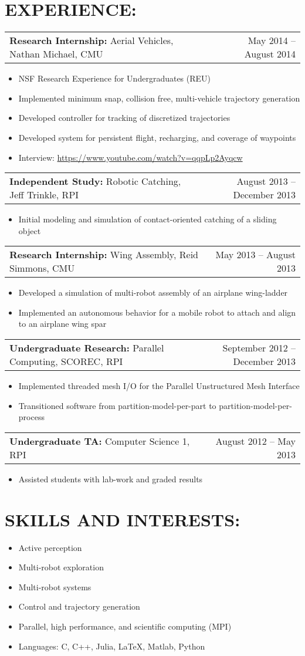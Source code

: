 \documentclass[margin]{res}
\newcommand{\experience}[4]{
	\begin{tabular}{p{4in} r}
    {\bf #1} #2 & #3
  \end{tabular}
  \begin{itemize}
      #4
  \end{itemize}
}
\begin{document}
\begin{resume}
 \section{EXPERIENCE:}
  \experience{Research Internship:}{Aerial Vehicles, Nathan Michael, CMU}
    {May 2014 -- August 2014}
  {
    \item NSF Research Experience for Undergraduates (REU)
    \item Implemented minimum snap, collision free, multi-vehicle trajectory
      generation
    \item Developed controller for tracking of discretized trajectories
    \item Developed system for persistent flight, recharging, and coverage of waypoints
    \item Interview: \url{https://www.youtube.com/watch?v=qqpLp2Ayqcw}
  }
  \experience{Independent Study:}{Robotic Catching, Jeff Trinkle, RPI}{ August
  2013 -- December 2013}
  {
    \item Initial modeling and simulation of contact-oriented catching of a sliding object
  }
  \experience{Research Internship:}{Wing Assembly, Reid Simmons, CMU}{May 2013 -- August 2013}
  {
    \item Developed a simulation of multi-robot assembly of an airplane wing-ladder
    \item Implemented an autonomous behavior for a mobile robot to attach and
      align to an airplane wing spar
  }
  \experience{Undergraduate Research:}{Parallel Computing, SCOREC, RPI}{September 2012 -- December 2013}
  {
		\item Implemented threaded mesh I/O for the Parallel Unstructured Mesh Interface
    \item Transitioned software from partition-model-per-part to partition-model-per-process
  }
  \experience{Undergraduate TA:}{Computer Science 1, RPI}{August 2012 -- May 2013}
  {
		\item Assisted students with lab-work and graded results
  }
\section{SKILLS AND INTERESTS:}
  \begin{itemize}
    \item Active perception
    \item Multi-robot exploration
    \item Multi-robot systems
    \item Control and trajectory generation
    \item Parallel, high performance, and scientific computing (MPI)
    \item Languages: C, C++, Julia, \LaTeX, Matlab, Python
	\end{itemize}


\end{resume}
\end{document}
